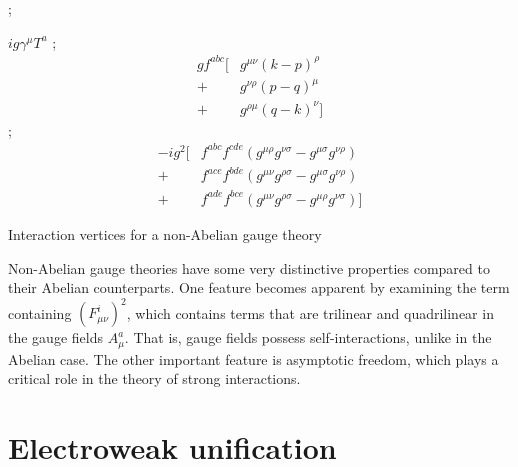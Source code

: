 \begin{marginfigure}[-3cm]
  ;

  $ig\gamma^\mu T^a$
\vskip 1cm
;
\begin{align*}
  gf^{abc}[&g^{\mu\nu}(k-p)^\rho\\
          +&g^{\nu\rho}(p-q)^\mu\\
          +&g^{\rho\mu}(q-k)^\nu]
\end{align*}
\vskip 1cm
;
\begin{align*}
 -ig^2[&f^{abc}f^{cde}(g^{\mu\rho}g^{\nu\sigma}-g^{\mu\sigma}g^{\nu\rho})\\
       +&f^{ace}f^{bde}(g^{\mu\nu}g^{\rho\sigma}-g^{\mu\sigma}g^{\nu\rho})\\
       +&f^{ade}f^{bce}(g^{\mu\nu}g^{\rho\sigma}-g^{\mu\rho}g^{\nu\sigma})]
\end{align*}
\caption{Interaction vertices for a non-Abelian gauge theory}
\end{marginfigure}
Non-Abelian gauge theories have some very distinctive properties compared to their Abelian counterparts. One feature becomes apparent by examining the term containing $(F_{\mu\nu}^i)^2$, which contains terms that are trilinear and quadrilinear in the gauge fields $A_\mu^a$. That is, gauge fields possess self-interactions, unlike in the Abelian case. The other important feature is asymptotic freedom, which plays a critical role in the theory of strong interactions. 

\section{Electroweak unification}

